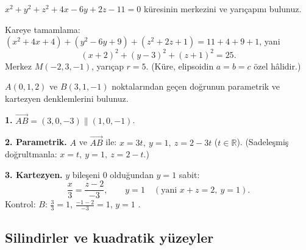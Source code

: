 \begin{soru}
$x^2+y^2+z^2+4x-6y+2z-11=0$ küresinin merkezini ve yarıçapını bulunuz.
\end{soru}
\begin{cevap}
Kareye tamamlama: $(x^2+4x+4)+(y^2-6y+9)+(z^2+2z+1)=11+4+9+1$, yani
\[ (x+2)^2+(y-3)^2+(z+1)^2=25 . \]
Merkez $\boxed{M(-2,3,-1)}$, yarıçap $\boxed{r=5}$. (Küre, elipsoidin $a=b=c$ özel hâlidir.)
\end{cevap}

\begin{soru}
$A(0,1,2)$ ve $B(3,1,-1)$ noktalarından geçen doğrunun parametrik ve kartezyen denklemlerini bulunuz.
\end{soru}
\begin{cevap}
\textbf{1.} $\overrightarrow{AB}=(3,0,-3)\parallel(1,0,-1)$.

\textbf{2. Parametrik.} $A$ ve $\overrightarrow{AB}$ ile: $x=3t,\ y=1,\ z=2-3t$ ($t\in\mathbb R$). (Sadeleşmiş doğrultmanla: $x=t,\ y=1,\ z=2-t$.)

\textbf{3. Kartezyen.} $y$ bileşeni $0$ olduğundan $y=1$ sabit:
\[ \boxed{\frac{x}{3}=\frac{z-2}{-3},\qquad y=1}\quad(\text{yani } x+z=2,\ y=1). \]
Kontrol: $B$: $\frac33=1$, $\frac{-1-2}{-3}=1$, $y=1$ \checkmark.
\end{cevap}

\subsection{Silindirler ve kuadratik yüzeyler}

